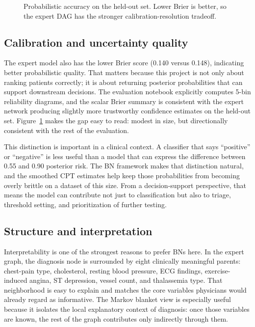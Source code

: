 \documentclass[10pt,twocolumn]{article}
\begin{document}
\begin{figure}[t]
\centering
{}
\caption{Probabilistic accuracy on the held-out set. Lower Brier is better, so the expert DAG has the stronger calibration-resolution tradeoff.}
\label{fig:brier}
\end{figure}

\subsection{Calibration and uncertainty quality}
The expert model also has the lower Brier score (0.140 versus 0.148), indicating better probabilistic quality. That matters because this project is not only about ranking patients correctly; it is about returning posterior probabilities that can support downstream decisions. The evaluation notebook explicitly computes 5-bin reliability diagrams, and the scalar Brier summary is consistent with the expert network producing slightly more trustworthy confidence estimates on the held-out set. Figure~\ref{fig:brier} makes the gap easy to read: modest in size, but directionally consistent with the rest of the evaluation.

This distinction is important in a clinical context. A classifier that says ``positive'' or ``negative'' is less useful than a model that can express the difference between 0.55 and 0.90 posterior risk. The BN framework makes that distinction natural, and the smoothed CPT estimates help keep those probabilities from becoming overly brittle on a dataset of this size. From a decision-support perspective, that means the model can contribute not just to classification but also to triage, threshold setting, and prioritization of further testing.

\subsection{Structure and interpretation}
Interpretability is one of the strongest reasons to prefer BNs here. In the expert graph, the diagnosis node is surrounded by eight clinically meaningful parents: chest-pain type, cholesterol, resting blood pressure, ECG findings, exercise-induced angina, ST depression, vessel count, and thalassemia type. That neighborhood is easy to explain and matches the core variables physicians would already regard as informative. The Markov blanket view is especially useful because it isolates the local explanatory context of diagnosis: once those variables are known, the rest of the graph contributes only indirectly through them.
\end{document}
